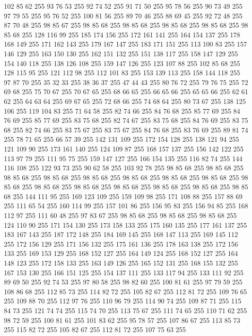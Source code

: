 102 85 62 255 93 76 53 255 92 74 52 255 91 71 50 255 95 78 56 255 90 73 49 255 97 79 55 255 95 76 52 255 100 81 56 255 89 70 46 255 88 69 45 255 92 72 48 255 87 70 48 255 98 85 67 255 98 85 68 255 98 85 68 255 98 85 68 255 98 85 68 255 98 85 68 255 128 116 99 255 185 174 156 255 172 161 141 255 164 154 137 255 178 168 149 255 171 162 143 255 179 167 147 255 183 171 151 255 113 100 83 255 157 146 129 255 163 150 130 255 162 151 132 255 151 138 117 255 158 147 129 255 154 140 118 255 138 126 108 255 159 147 126 255 123 107 88 255 102 85 68 255 128 115 95 255 121 112 98 255 112 101 83 255 153 139 113 255 158 144 118 255 97 87 70 255 35 32 33 255 38 36 37 255 47 44 43 255 80 76 72 255 79 76 75 255 72 69 68 255 75 70 67 255 70 67 65 255 68 66 65 255 66 65 66 255 65 65 66 255 62 61 62 255 64 63 64 255 69 67 65 255 72 68 66 255 74 68 64 255 80 73 67 255 138 125 106 255 119 104 83 255 71 64 58 255
82 74 66 255 84 76 68 255 85 77 69 255 84 76 69 255 85 77 69 255 83 75 68 255 82 74 67 255 83 75 68 255 84 76 69 255 83 75 68 255 82 74 66 255 83 75 67 255 83 75 67 255 84 76 68 255 83 76 69 255 89 81 74 255 78 71 65 255 66 57 39 255 142 131 109 255 172 154 128 255 138 121 94 255 121 109 90 255 173 161 140 255 124 109 87 255 168 157 137 255 156 142 122 255 113 97 79 255 111 95 75 255 159 147 127 255 166 154 135 255 116 82 74 255 144 116 108 255 122 93 73 255 90 62 58 255 103 92 78 255 98 85 68 255 98 85 68 255 98 85 68 255 98 85 68 255 98 85 68 255 98 85 68 255 98 85 68 255 98 85 68 255 98 85 68 255 98 85 68 255 98 85 68 255 98 85 68 255 98 85 68 255 98 85 68 255 98 85 68 255 144 111 95 255 169 123 109 255 159 109 98 255 171 108 88 255 157 88 69 255 111 65 54 255 160 114 99 255 157 101 86 255 156 95 83 255 156 94 85 255 168 112 97 255 111 60 48 255 97 83 67 255 98 85 68 255
98 85 68 255 98 85 68 255 124 110 90 255 171 154 130 255 173 158 133 255 175 160 135 255 177 161 137 255 183 167 143 255 187 172 148 255 184 169 145 255 168 147 113 255 169 145 112 255 172 156 129 255 171 156 132 255 175 161 136 255 178 163 138 255 172 156 133 255 169 153 129 255 168 152 127 255 164 149 124 255 168 152 127 255 164 148 123 255 172 158 133 255 163 149 126 255 165 152 131 255 168 155 132 255 167 153 130 255 166 151 125 255 154 137 111 255 133 117 94 255 133 111 92 255 89 69 50 255 92 74 53 255 97 80 58 255 98 82 60 255 100 81 61 255 97 79 59 255 108 86 68 255 112 85 73 255 114 82 72 255 105 82 67 255 112 81 72 255 109 76 65 255 109 88 70 255 112 97 76 255 110 96 79 255 114 90 74 255 109 87 71 255 115 84 73 255 121 74 74 255 115 74 70 255 113 75 67 255 111 74 65 255 110 71 62 255 98 72 59 255 100 81 61 255 101 83 62 255 95 78 57 255 107 86 67 255 113 85 73 255 115 82 72 255 105 82 67 255 112 81 72 255 107 75 63 255
